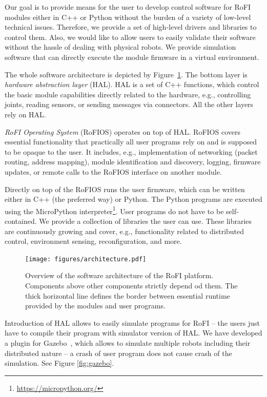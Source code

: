 Our goal is to provide means for the user to develop control software for RoFI
modules either in C++ or Python without the burden of a variety of low-level
technical issues. Therefore, we provide a set of high-level drivers and
libraries to control them. Also, we would like to allow users to easily validate
their software without the hassle of dealing with physical robots. We provide
simulation software that can directly execute the module firmware in a virtual
environment.

The whole software architecture is depicted by
Figure~\ref{fig:architecture}. The bottom layer is \emph{hardware abstraction
  layer} (HAL). HAL is a set of C++ functions, which control the basic module
capabilities directly related to the hardware, e.g., controlling joints, reading
sensors, or sending messages via connectors. All the other layers rely on HAL.

\emph{RoFI Operating System} (RoFIOS) operates on top of HAL. RoFIOS covers
essential functionality that practically all user programs rely on and is
supposed to be opaque to the user. It includes, e.g., implementation of
networking (packet routing, address mapping), module identification and
discovery, logging, firmware updates, or remote calls to the RoFIOS interface on
another module.

Directly on top of the RoFIOS runs the user firmware, which can be written
either in C++ (the preferred way) or Python. The Python programs are executed
using the MicroPython interpreter\footnote{\url{https://micropython.org/}}. User
programs do not have to be self-contained. We provide a collection of libraries
the user can use. These libraries are continuously growing and cover, e.g.,
functionality related to distributed control, environment sensing,
reconfiguration, and more.

\begin{figure}[t]
   \centering
   \texttt{[image: figures/architecture.pdf]}
   \caption{Overview of the software architecture of the RoFI platform.
   Components above other components strictly depend od them. The thick
   horizontal line defines the border between essential runtime provided by the
   modules and user programs.}
   \label{fig:architecture}
\end{figure}

Introduction of HAL allows to easily simulate programs for RoFI -- the users
just have to compile their program with simulator version of HAL. We have
developed a plugin for Gazebo~\cite{Gazebo}, which allows to simulate multiple
robots including their distributed nature -- a crash of user program does not
cause crash of the simulation. See Figure \ref{fig:gazebo}.

